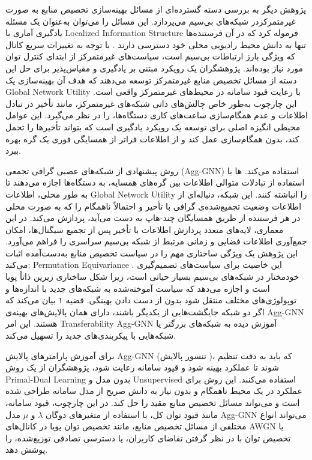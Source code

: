پژوهش دیگر به بررسی دسته گسترده‌ای از مسائل بهینه‌سازی تخصیص منابع به صورت غیرمتمرکزدر شبکه‌های بی‌سیم می‌پردازد. این مسائل را می‌توان به‌عنوان یک مسئله یادگیری آماری با 
\gls{Localized Information Structure}
فرموله کرد که در آن فرستنده‌ها تنها به دانش محیط رادیویی محلی خود دسترسی دارند . با توجه به تغییرات سریع کانال که ویژگی بارز ارتباطات بی‌سیم است، سیاست‌های غیرمتمرکز از ابتدای کنترل توان مورد نیاز بوده‌اند.
پژوهشگران یک رویکرد مبتنی بر یادگیری و مقیاس‌پذیر برای حل این دسته از مسائل تخصیص منابع غیرمتمرکز توسعه می‌دهند که هدف آن بهینه‌سازی یک  
\gls{Global Network Utility}
با رعایت قیود سامانه در محیط‌های غیرمتمرکز واقعی است. این چارچوب به‌طور خاص چالش‌های ذاتی شبکه‌های غیرمتمرکز، مانند تأخیر در تبادل اطلاعات و عدم همگام‌سازی ساعت‌های کاری دستگاه‌ها، را در نظر می‌گیرد. این عوامل محیطی انگیزه اصلی برای توسعه یک رویکرد یادگیری است که بتواند تأخیرها را تحمل کند، بدون همگام‌سازی عمل کند و از اطلاعات فراتر از همسایگی فوری یک گره بهره ببرد.

روش پیشنهادی از شبکه‌های عصبی گرافی تجمعی 
(\gls{Agg-GNN})
استفاده می‌کند. 
ها
 با استفاده از تبادلات متوالی اطلاعات بین گره‌های همسایه، به دستگاه‌ها اجازه می‌دهند تا به طور محلی، اطلاعات 
\gls{Global Network Utility}
را انباشته کنند. این شبکه، دنباله‌ای از اطلاعات وضعیت تجمیع‌شده‌ی گرافی با تأخیر و احتمالاً ناهمگام را که به صورت محلی در هر فرستنده از طریق همسایگان چند-هاپ به دست می‌آید، پردازش می‌کند. در این معماری، لایه‌های متعدد پردازش اطلاعات با تأخیر پس از تجمیع سیگنال‌ها، امکان جمع‌آوری اطلاعات فضایی و زمانی مرتبط از شبکه بی‌سیم سراسری را فراهم می‌آورد.
این پژوهش یک ویژگی ساختاری مهم را در سیاست تخصیص منابع به‌دست‌آمده اثبات می‌کند: 
\gls{Permutation Equivariance}
. این خاصیت برای سیاست‌های تصمیم‌گیری خودمختار در شبکه‌های بی‌سیم بسیار حیاتی است، زیرا شکل ساختاری زیرین ذاتاً پویا است و اجازه می‌دهد که سیاست آموخته‌شده به شبکه‌های جدید با اندازه‌ها و توپولوژی‌های مختلف منتقل شود بدون از دست دادن بهینگی. قضیه ۱ بیان می‌کند که اگر دو شبکه جایگشت‌هایی از یکدیگر باشند، دارای همان پالایش‌های بهینه‌ی 
\gls{Agg-GNN}
هستند. این امر 
\gls{Transferability}
\gls{Agg-GNN}
آموزش دیده به شبکه‌های بزرگتر یا شبکه‌هایی با پیکربندی‌های جدید را تسهیل می‌کند.

برای آموزش پارامترهای پالایش 
\gls{Agg-GNN}
(تنسور پالایش 
)،
 که باید به دقت تنظیم شوند تا عملکرد بهینه شود و قیود سامانه رعایت شود، پژوهشگران از یک روش 
\gls{Primal-Dual Learning}
بدون مدل و 
\gls{Unsupervised}
استفاده می‌کنند. این روش برای عملکرد در یک محیط ناهمگام و بدون نیاز به دانش صریح از مدل سامانه طراحی شده است و می‌تواند مسائل تخصیص منابع مقید را حل کند. در این چارچوب، قیود سامانه، مانند قیود توان کل، با استفاده از متغیرهای دوگان $\lambda$ و $\mu$	 
مدل 
\gls{Agg-GNN}
می‌تواند انواع مختلفی از مسائل تخصیص منابع، مانند تخصیص توان پویا در کانال‌های 
\gls{AWGN}
یا تخصیص توان با در نظر گرفتن تقاضای کاربران، یا دسترسی تصادفی توزیع‌شده، را پوشش دهد.


